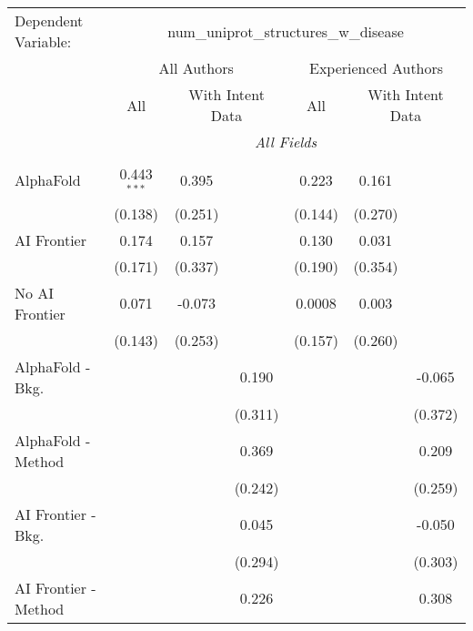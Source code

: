 \begingroup
\centering
\begin{tabular}{lcccccc}
   \tabularnewline \midrule \midrule
   Dependent Variable: & \multicolumn{6}{c}{num\_uniprot\_structures\_w\_disease}\\
 & \multicolumn{3}{c}{All Authors} & \multicolumn{3}{c}{Experienced Authors} \\
\cmidrule(lr){2-4} \cmidrule(lr){5-7}
 & \multicolumn{1}{c}{All} & \multicolumn{2}{c}{With Intent Data} & \multicolumn{1}{c}{All} & \multicolumn{2}{c}{With Intent Data} \\
\cmidrule(lr){2-2} \cmidrule(lr){3-4} \cmidrule(lr){5-5} \cmidrule(lr){6-7}
 & \multicolumn{6}{c}{\textit{All Fields}} \\ \\
   AlphaFold               & 0.443$^{***}$ & 0.395   &              & 0.223   & 0.161   &   \\   
                           & (0.138)       & (0.251) &              & (0.144) & (0.270) &   \\   
   AI Frontier             & 0.174         & 0.157   &              & 0.130   & 0.031   &   \\   
                           & (0.171)       & (0.337) &              & (0.190) & (0.354) &   \\   
   No AI Frontier          & 0.071         & -0.073  &              & 0.0008  & 0.003   &   \\   
                           & (0.143)       & (0.253) &              & (0.157) & (0.260) &   \\   
   AlphaFold - Bkg.        &               &         & 0.190        &         &         & -0.065\\   
                           &               &         & (0.311)      &         &         & (0.372)\\   
   AlphaFold - Method      &               &         & 0.369        &         &         & 0.209\\   
                           &               &         & (0.242)      &         &         & (0.259)\\   
   AI Frontier - Bkg.      &               &         & 0.045        &         &         & -0.050\\   
                           &               &         & (0.294)      &         &         & (0.303)\\   
   AI Frontier - Method    &               &         & 0.226        &         &         & 0.308\\   

\end{tabular}
